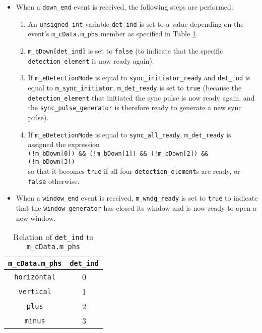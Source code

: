 \begin{itemize}
\begin{enumerate}
\end{enumerate}

\item When a \texttt{down\_end} event is received, the following steps are performed:

\begin{enumerate}

\item An \texttt{unsigned int} variable \texttt{det\_ind} is set to a value depending on the event's \texttt{m\_cData.m\_phs} member as specified in Table \ref{tab:com_detector_syncpgen}.

\item \texttt{m\_bDown[det\_ind]} is set to \texttt{false} (to indicate that the specific \texttt{detection\_element} is now ready again).

\item If \texttt{m\_eDetectionMode} is equal to \texttt{sync\_initiator\_ready} and \texttt{det\_ind} is equal to \texttt{m\_sync\_initiator}, \texttt{m\_det\_ready} is set to \texttt{true} (because the \texttt{detection\_element} that initiated the sync pulse is now ready again, and the \texttt{sync\_pulse\_generator} is therefore ready to generate a new sync pulse).

\item If \texttt{m\_eDetectionMode} is equal to \texttt{sync\_all\_ready}, \texttt{m\_det\_ready} is assigned the expression\\
\texttt{(!m\_bDown[0]) \&\& (!m\_bDown[1]) \&\& (!m\_bDown[2]) \&\& (!m\_bDown[3])}\\
so that it becomes \texttt{true} if all four \texttt{detection\_element}s are ready, or \texttt{false} otherwise.

\end{enumerate}

\item When a \texttt{window\_end} event is received, \texttt{m\_wndg\_ready} is set to \texttt{true} to indicate that the \texttt{window\_generator} has closed its window and is now ready to open a new window.

\end{itemize}

\begin{table}[H]
\begin{tabular}{| c | c |}
\hline
  \textbf{\texttt{m\_cData.m\_phs}} & \textbf{\texttt{det\_ind}} \\
\hline
  \texttt{horizontal} & 0 \\
\hline
  \texttt{vertical} & 1 \\
\hline
  \texttt{plus} & 2 \\
\hline
  \texttt{minus} & 3 \\
\hline
\end{tabular}
\caption{Relation of \texttt{det\_ind} to \texttt{m\_cData.m\_phs}}
\label{tab:com_detector_syncpgen}
\end{table}

